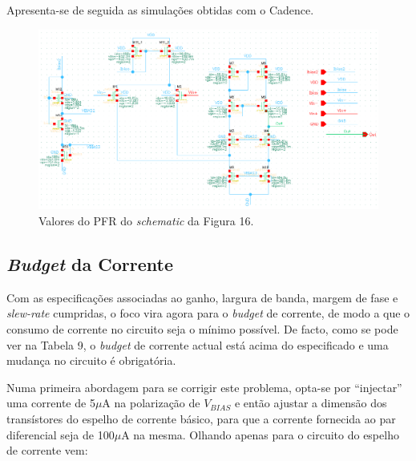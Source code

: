 \documentclass[11pt]{article}
\numberwithin{equation}{section}
\begin{document}
Apresenta-se de seguida as simulações obtidas com o Cadence.

\begin{figure}[H]
	\centering
	\includegraphics[keepaspectratio=true, scale=0.85]{exps/PFRajustesF1}
	\vspace{-0.5em}
	\caption{Valores do PFR do \textit{schematic} da Figura 16.}
	\vspace{-0.8em}
\end{figure} 


\subsection{\textit{Budget} da Corrente}

Com as especificações associadas ao ganho, largura de banda, margem de fase e \textit{slew-rate} cumpridas, o foco vira agora para o \textit{budget} de corrente, de modo a que o consumo de corrente no circuito seja o mínimo possível. De facto, como se pode ver na Tabela 9, o \textit{budget} de corrente actual está acima do especificado e uma mudança no circuito é obrigatória.

Numa primeira abordagem para se corrigir este problema, opta-se por ``injectar'' uma corrente de 5$\mu$A na polarização de $V_{BIAS}$ e então ajustar a dimensão dos transístores do espelho de corrente básico, para que a corrente fornecida ao par diferencial seja de 100$\mu$A na mesma. Olhando apenas para o circuito do espelho de corrente vem:
\end{document}
